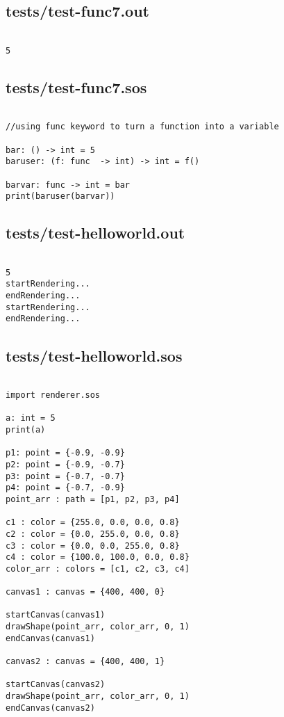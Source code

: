 \documentclass[main.tex]{subfiles}
\begin{document}
\subsection{tests/test-func7.out}

\begin{lstlisting}

5
\end{lstlisting}

\subsection{tests/test-func7.sos}

\begin{lstlisting}

//using func keyword to turn a function into a variable

bar: () -> int = 5
baruser: (f: func  -> int) -> int = f()

barvar: func -> int = bar
print(baruser(barvar))
\end{lstlisting}

\subsection{tests/test-helloworld.out}

\begin{lstlisting}

5
startRendering...
endRendering...
startRendering...
endRendering...
\end{lstlisting}

\subsection{tests/test-helloworld.sos}

\begin{lstlisting}

import renderer.sos

a: int = 5
print(a)

p1: point = {-0.9, -0.9}
p2: point = {-0.9, -0.7}
p3: point = {-0.7, -0.7}
p4: point = {-0.7, -0.9}
point_arr : path = [p1, p2, p3, p4]

c1 : color = {255.0, 0.0, 0.0, 0.8}
c2 : color = {0.0, 255.0, 0.0, 0.8}
c3 : color = {0.0, 0.0, 255.0, 0.8}
c4 : color = {100.0, 100.0, 0.0, 0.8}
color_arr : colors = [c1, c2, c3, c4]

canvas1 : canvas = {400, 400, 0}

startCanvas(canvas1)
drawShape(point_arr, color_arr, 0, 1)
endCanvas(canvas1)

canvas2 : canvas = {400, 400, 1}

startCanvas(canvas2)
drawShape(point_arr, color_arr, 0, 1)
endCanvas(canvas2)
\end{lstlisting}
\end{document}
